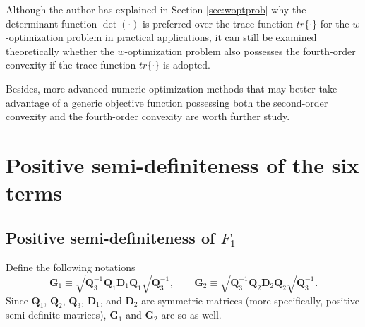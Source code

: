 \documentclass[12pt]{article}
\begin{document}
Although the author has explained in Section \ref{sec:woptprob} why the determinant function $\det(\cdot)$ is preferred over the trace function $tr \{ \cdot \}$ for the $w$-optimization problem in practical applications, it can still be examined theoretically whether the $w$-optimization problem also possesses the fourth-order convexity if the trace function $tr \{ \cdot \}$ is adopted.

Besides, more advanced numeric optimization methods that may better take advantage of a generic objective function possessing both the second-order convexity and the fourth-order convexity are worth further study.


\appendix

\section{Positive semi-definiteness of the six terms}

\subsection{Positive semi-definiteness of $F_1$}  \label{app:dif4_F1}

Define the following notations
\begin{equation}  \label{eq:vars_G1+G2}
\mathbf{G}_1 \equiv \sqrt{\mathbf{Q}_3^{-1}} \mathbf{Q}_1 \mathbf{D}_1 \mathbf{Q}_1 \sqrt{\mathbf{Q}_3^{-1}}, \qquad \mathbf{G}_2 \equiv \sqrt{\mathbf{Q}_3^{-1}} \mathbf{Q}_2 \mathbf{D}_2 \mathbf{Q}_2 \sqrt{\mathbf{Q}_3^{-1}}.
\end{equation}
Since $\mathbf{Q}_1$, $\mathbf{Q}_2$, $\mathbf{Q}_3$, $\mathbf{D}_1$, and $\mathbf{D}_2$ are symmetric matrices (more specifically, positive semi-definite matrices), $\mathbf{G}_1$ and $\mathbf{G}_2$ are so as well.
\end{document}
